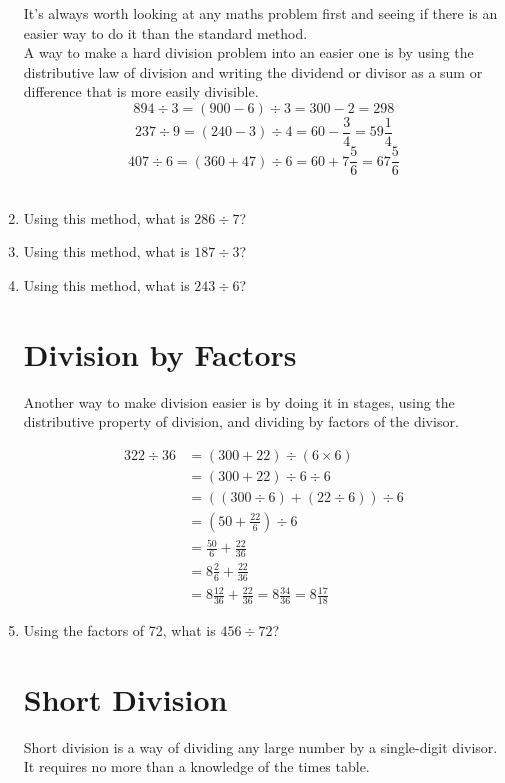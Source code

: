 \documentclass[12pt]{article}
\begin{document}
\begin{enumerate}
It's always worth looking at any maths problem first and seeing if there is an easier way to do it than the standard method.\\

A way to make a hard division problem into an easier one is by using the distributive law of division and writing the dividend or divisor as a sum or difference that is more easily divisible.\\

$$894 \div 3 = (900 - 6) \div 3 = 300 - 2 = 298$$
$$237 \div 9 = (240 - 3) \div 4 = 60 - \frac{3}{4} = 59 \frac{1}{4}$$
$$407 \div 6 = (360 + 47) \div 6 = 60 + 7 \frac{5}{6} = 67 \frac{5}{6}$$\\

\item Using this method, what is $286 \div 7$?
\item Using this method, what is $187 \div 3$?
\item Using this method, what is $243 \div 6$?

\section*{Division by Factors}

Another way to make division easier is by doing it in stages, using the distributive property of division, and dividing by factors of the divisor.

\begin{align*}
322 \div 36 & = (300+22) \div (6 \times 6)\\
            & = (300+22) \div 6 \div 6\\
            & = ((300 \div 6)+(22 \div 6)) \div 6\\
            & = (50 + \frac{22}{6}) \div 6\\
            & = \frac{50}{6} + \frac{22}{36}\\
            & = 8 \frac{2}{6} + \frac{22}{36}\\
            & = 8 \frac{12}{36} + \frac{22}{36} = 8 \frac{34}{36} = 8 \frac{17}{18}
\end{align*}

\item Using the factors of 72, what is $456 \div 72$?

\section*{Short Division}
Short division is a way of dividing any large number by a single-digit divisor. It requires no more than a knowledge of the times table.\\


\end{enumerate}
\end{document}
